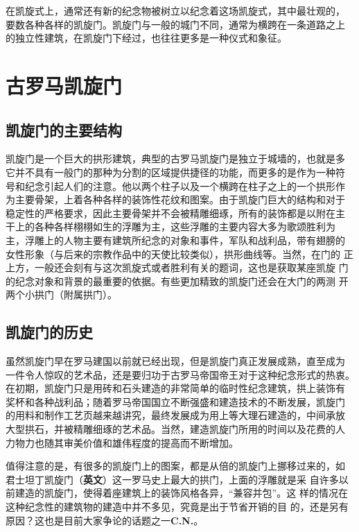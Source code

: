 \documentclass[a4paper,dvipdfm]{article}
\begin{document}
在凯旋式上，通常还有新的纪念物被树立以纪念着这场凯旋式，其中最壮观的，
要数各种各样的凯旋门。凯旋门与一般的城门不同，通常为横跨在一条道路之上
的独立性建筑，在凯旋门下经过，也往往更多是一种仪式和象征。


\section{古罗马凯旋门}

\subsection{凯旋门的主要结构}

凯旋门是一个巨大的拱形建筑，典型的古罗马凯旋门是独立于城墙的，也就是多
它并不具有一般门的那种为分割的区域提供捷径的功能，而更多的是作为一种符
号和纪念引起人们的注意。他以两个柱子以及一个横跨在柱子之上的一个拱形作
为主要骨架，上着各种各样的装饰性花纹和图案。由于凯旋门巨大的结构和对于
稳定性的严格要求，因此主要骨架并不会被精雕细琢，所有的装饰都是以附在主
干上的各种各样栩栩如生的浮雕为主，这些浮雕的主要内容大多为歌颂胜利为
主，浮雕上的人物主要有建筑所纪念的对象和事件，军队和战利品，带有翅膀的
女性形象（与后来的宗教作品中的天使比较类似），拱形曲线等。当然，在门的
正上方，一般还会刻有与这次凯旋式或者胜利有关的题词，这也是获取某座凯旋
门的纪念对象和背景的最重要的依据。有些更加精致的凯旋门还会在大门的两测
开两个小拱门（附属拱门）。

\subsection{凯旋门的历史}

虽然凯旋门早在罗马建国以前就已经出现，但是凯旋门真正发展成熟，直至成为
一件令人惊叹的艺术品，还是要归功于古罗马帝国帝王对于这种纪念形式的热衷。
在初期，凯旋门只是用砖和石头建造的非常简单的临时性纪念建筑，拱上装饰有
奖杯和各种战利品；随着罗马帝国国立不断强盛和建造技术的不断发展，凯旋门
的用料和制作工艺页越来越讲究，最终发展成为用上等大理石建造的，中间承放
大型拱石，并被精雕细琢的艺术品。当然，建造凯旋门所用的时间以及花费的人
力物力也随其审美价值和雄伟程度的提高而不断增加。

值得注意的是，有很多的凯旋门上的图案，都是从倍的凯旋门上挪移过来的，如
君士坦丁凯旋门（\textbf{英文}）这一罗马史上最大的拱门，上面的浮雕就是采
自许多以前建造的凯旋门，使得着座建筑上的装饰风格各异，``兼容并包''。这
样的情况在这种纪念性的建筑物的建造中并不多见，究竟是出于节省开销的目
的，还是另有原因？这也是目前大家争论的话题之一\textbf{C.N.}。
\end{document}
